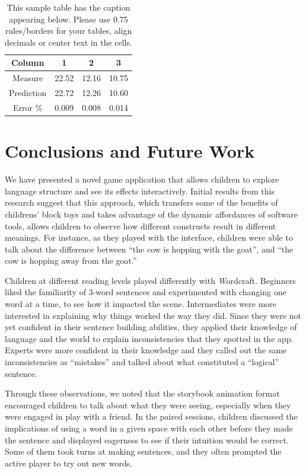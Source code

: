 \documentclass{sigchi-ext}
\newcommand\tabhead[1]{\textbf{#1}}
\begin{document}
\begin{table}
\centering
\scriptsize
	\begin{tabular}{|c|c|c|c|}
	\hline
	\tabhead{Column} & \tabhead{1} & \tabhead{2} & \tabhead{3} \\
	\hline
	Measure & 22.52 & 12.16 & 10.75 \\\hline
	Prediction & 22.72 & 12.26 & 10.60 \\\hline
	Error \% & 0.009 & 0.008 & 0.014 \\\hline
	\end{tabular}
	\caption{This sample table has the caption appearing below.
	Please use 0.75 rules/borders for your tables, align decimals or
	center text in the cells.}\label{tab:sample}
\end{table}


\section{Conclusions and Future Work}
We have presented a novel game application that allows children to explore language structure and see its effects interactively.  Initial results from this research suggest that this approach, which transfers some of the benefits of childrens’ block toys and takes advantage of the dynamic affordances of software tools, allows children to observe how different constructs result in different meanings. For instance, as they played with the interface, children were able to talk about the difference between ``the cow is hopping with the goat'', and ``the cow is hopping away from the goat.''

Children at different reading levels played differently with \emph Wordcraft. Beginners liked the familiarity of 3-word sentences and experimented with changing one word at a time, to see how it impacted the scene. Intermediates were more interested in explaining why things worked the way they did. Since they were not yet confident in their sentence building abilities, they applied their knowledge of language and the world to explain inconsistencies that they spotted in the app. Experts were more confident in their knowledge and they called out the same inconsistencies as ``mistakes'' and talked about what constituted a ``logical'' sentence.

Through these observations, we noted that the storybook animation format encouraged children to talk about what they were seeing, especially when they were engaged in play with a friend. In the paired sessions, children discussed the implications of using a word in a given space with each other before they made the sentence and displayed eagerness to see if their intuition would be correct. Some of them took turns at making sentences, and they often prompted the active player to try out new words.
\end{document}
